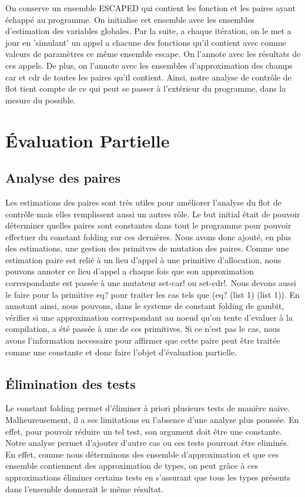 On conserve un ensemble ESCAPED qui contient les fonction et les
paires ayant échappé au programme. On initialise cet ensemble avec les
ensembles d'estimation des variables globales. Par la suite, a chaque
itération, on le met a jour en 'simulant' un appel a chacune des
fonctions qu'il contient avec comme valeurs de paramètres ce même
ensemble escape. On l'annote avec les résultats de ces appels. De
plus, on l'annote avec les ensembles d'approximation des champs car et
cdr de toutes les paires qu'il contient. Ainsi, notre analyse de
contrôle de flot tient compte de ce qui peut se passer à l'extérieur
du programme, dans la mesure du possible.

\clearpage

\section{Évaluation Partielle}

\subsection{Analyse des paires}

Les estimations des paires sont très utiles pour améliorer l'analyse
du flot de contrôle mais elles remplissent aussi un autres rôle. Le
but initial était de pouvoir déterminer quelles paires sont constantes
dans tout le programme pour pouvoir effectuer du constant folding sur
ces dernières. Nous avons donc ajouté, en plus des estimations, une
gestion des primitves de mutation des paires. Comme une estimation
paire est relié à un lieu d'appel à une primitive d'allocation, nous
pouvons annoter ce lieu d'appel a chaque fois que son approximation
correspondante est passée à une mutateur set-car! ou set-cdr!. Nous
devons aussi le faire pour la primitive eq?  pour traiter les cas tels
que (eq? (list 1) (list 1)). En annotant ainsi, nous pouvons, dans le
systeme de constant folding de gambit, vérifier si une approximation
correspondant au noeud qu'on tente d'evaluer à la compilation, a été
passée à une de ces primitives. Si ce n'est pas le cas, nous avons
l'information necessaire pour affirmer que cette paire peut être
traitée comme une constante et donc faire l'objet d'évaluation
partielle.

\subsection{Élimination des tests}

Le constant folding permet d'éliminer à priori plusieurs tests de
manière naive. Malheureusement, il a ses limitations en l'absence
d'une analyse plus poussée. En effet, pour pouvoir réduire un tel
test, son argument doit être une constante.  Notre analyse permet
d'ajouter d'autre cas ou ces tests pourront être eliminés. En effet,
comme nous déterminons des ensemble d'approximation et que ces
ensemble contiennent des approximation de types, on peut grâce à ces
approximations éliminer certains tests en s'assurant que tous les
types présents dans l'ensemble donnerait le même résultat.

